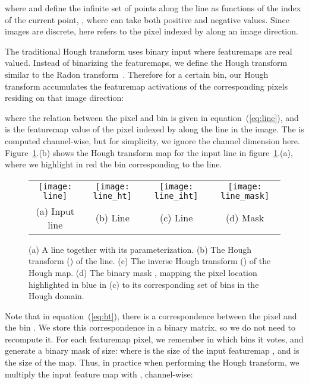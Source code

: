 \documentclass[runningheads]{llncs}
\begin{document}
where  and  define the infinite set of points along the line as functions of the index of the current point, , where  can take both positive and negative values.  
Since images are discrete, here  refers to the pixel indexed by  along an image direction. 

The traditional Hough transform \cite{duda1972use,matas2000robust} uses binary input where featuremaps are real valued. Instead of binarizing the featuremaps, we define the Hough transform similar to the Radon transform~\cite{beatty2012radon}.
Therefore for a certain  bin, our Hough transform accumulates the featuremap activations  of the corresponding pixels residing on that image direction: 

where the relation between the pixel  and bin  is given in equation~(\ref{eq:line}), and  is the featuremap value of the pixel indexed by  along the  line in the image.
The  is computed channel-wise, but for simplicity, we ignore the channel dimension here. 
Figure~\ref{fig:forward}.(b) shows the Hough transform map for the input line in figure~\ref{fig:forward}.(a), where we highlight in red the bin corresponding to the line.
\begin{figure}[t]
    \centering
    \begin{tabular}{cccc}
    \texttt{[image: line]} &
    \texttt{[image: line\_ht]} &
    \texttt{[image: line\_iht]} &
    \texttt{[image: line\_mask]} \\
    (a) Input line & (b) Line  & (c) Line  & (d) Mask \\
    \end{tabular}
    \caption{(a) A line together with its  parameterization. 
    (b) The Hough transform () of the line.
    (c) The inverse Hough transform () of the Hough map.
    (d) The binary mask , mapping the pixel location  highlighted in blue in (c) to its corresponding set of bins in the Hough domain.}
    \label{fig:forward}
\end{figure}

Note that in equation~(\ref{eq:ht}), there is a correspondence between the pixel  and the bin .
We store this correspondence in a binary matrix, so we do not need to recompute it.
For each featuremap pixel, we remember in which  bins it votes, and generate a binary mask  of size:  where  is the size of the input featuremap , and  is the size of the  map. 
Thus, in practice when performing the Hough transform, we multiply the input feature map  with , channel-wise: 
\end{document}
